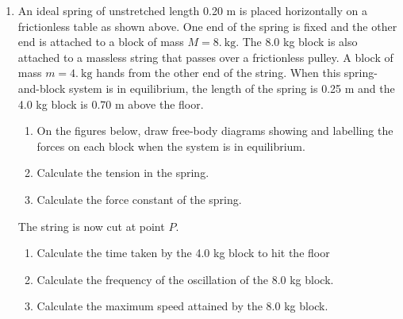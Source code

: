 \documentclass{../../../oss-apphys}
\begin{document}
\begin{enumerate}[leftmargin=15pt]
\item An ideal spring of unstretched length 0.20 m is placed horizontally on a
  frictionless table as shown above. One end of the spring is fixed and the
  other end is attached to a block of mass $M=\SI{8.}{\kilo\gram}$. The 8.0 kg
  block is also attached to a massless string that passes over a frictionless
  pulley. A block of mass $m=\SI{4.}{\kilo\gram}$ hands from the other end of
  the string. When this spring-and-block system is in equilibrium, the length
  of the spring is 0.25 m and the 4.0 kg block is 0.70 m above the floor.
  \begin{enumerate}[leftmargin=18pt,topsep=0pt,noitemsep]
  \item On the figures below, draw free-body diagrams showing and labelling
    the forces on each block when the system is in equilibrium.
    \begin{center}
      \hspace{2in}
    \end{center}
    \vspace{.5in}
  \item Calculate the tension in the spring.
  \item Calculate the force constant of the spring.
  \end{enumerate}
  The string is now cut at point $P$.
  \begin{enumerate}[leftmargin=18pt,topsep=0pt,noitemsep,resume]
  \item Calculate the time taken by the 4.0 kg block to hit the floor
  \item Calculate the frequency of the oscillation of the 8.0 kg block.
  \item Calculate the maximum speed attained by the 8.0 kg block.
  \end{enumerate}
  \newpage


\end{enumerate}
\end{document}
